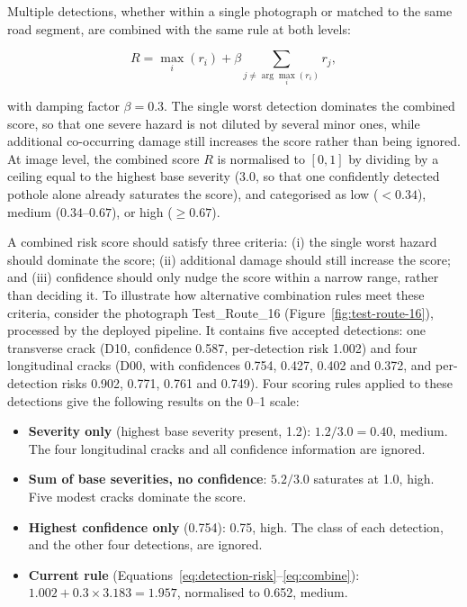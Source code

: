 \documentclass[10pt,a4paper,twocolumn]{article}
\begin{document}
Multiple detections, whether within a single photograph or matched to
the same road segment, are combined with the same rule at both levels:

\begin{equation}
  \label{eq:combine}
  R = \max_i(r_i) + \beta \sum_{j \neq \arg\max_i(r_i)} r_j,
\end{equation}

with damping factor $\beta = 0.3$. The single worst detection dominates
the combined score, so that one severe hazard is not diluted by several
minor ones, while additional co-occurring damage still increases the
score rather than being ignored. At image level, the combined score $R$
is normalised to $[0,1]$ by dividing by a ceiling equal to the highest
base severity (3.0, so that one confidently detected pothole alone
already saturates the score), and categorised as low
($<0.34$), medium ($0.34$--$0.67$), or high ($\geq 0.67$).

A combined risk score should satisfy three criteria: (i) the single worst
hazard should dominate the score; (ii) additional damage should still
increase the score; and (iii) confidence should only nudge the score within
a narrow range, rather than deciding it. To illustrate how alternative
combination rules meet these criteria, consider the photograph Test\_Route\_16 (Figure~\ref{fig:test-route-16}),
processed by the deployed pipeline. It contains five accepted detections: one transverse crack (D10, confidence
0.587, per-detection risk 1.002) and four longitudinal cracks (D00, with
confidences 0.754, 0.427, 0.402 and 0.372, and per-detection risks 0.902,
0.771, 0.761 and 0.749). Four scoring rules applied to these detections give
the following results on the 0--1 scale:

\begin{itemize}
  \item \textbf{Severity only} (highest base severity present, 1.2):
  $1.2 / 3.0 = 0.40$, medium. The four longitudinal cracks and all
  confidence information are ignored.
  \item \textbf{Sum of base severities, no confidence}: $5.2 / 3.0$
  saturates at 1.0, high. Five modest cracks dominate the score.
  \item \textbf{Highest confidence only} (0.754): 0.75, high. The class of
  each detection, and the other four detections, are ignored.
  \item \textbf{Current rule} (Equations~\ref{eq:detection-risk}--\ref{eq:combine}):
  $1.002 + 0.3 \times 3.183 = 1.957$, normalised to 0.652, medium.
\end{itemize}
\end{document}
